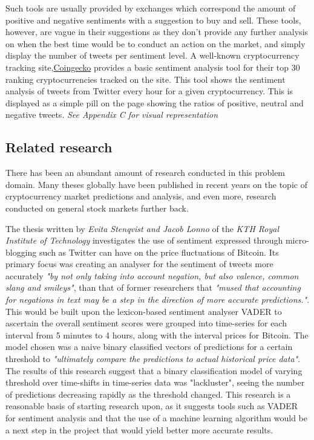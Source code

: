 \documentclass[oneside, 12pt]{article}
\begin{document}
		Such tools are usually provided by exchanges which correspond the amount of positive and negative sentiments with a suggestion to buy and sell. These tools, however, are vague in their suggestions as they don't provide any further analysis on when the best time would be to conduct an action on the market, and simply display the number of tweets per sentiment level. A well-known cryptocurrency tracking site,\href{https://www.coingecko.com}{Coingecko} provides a basic sentiment analysis tool for their top 30 ranking cryptocurrencies tracked on the site. This tool shows the sentiment analysis of tweets from Twitter every hour for a given cryptocurrency. This is displayed as a simple pill on the page showing the ratios of positive, neutral and negative tweets. \textit{See Appendix C for visual representation}
			
		\subsection{Related research}
		
		There has been an abundant amount of research conducted in this problem domain. Many theses globally have been published in recent years on the topic of cryptocurrency market predictions and analysis, and even more, research conducted on general stock markets further back. 
		
		The thesis written by \textit{Evita Stenqvist and Jacob Lonno} of the \textit{KTH Royal Institute of Technology} \cite{BTCFTsent} investigates the use of sentiment expressed through micro-blogging such as Twitter can have on the price fluctuations of Bitcoin. Its primary focus was creating an analyser for the sentiment of tweets more accurately \textit{"by not only taking into account negation, but also valence, common slang and smileys"}, than that of former researchers that \textit{"mused that accounting for negations in text may be a step in the direction of more accurate predictions."}. This would be built upon the lexicon-based sentiment analyser VADER to ascertain the overall sentiment scores were grouped into time-series for each interval from 5 minutes to 4 hours, along with the interval prices for Bitcoin. The model chosen was a naive binary classified vectors of predictions for a certain threshold to \textit{"ultimately compare the predictions to actual historical price data"}. The results of this research suggest that a binary classification model of varying threshold over time-shifts in time-series data was "lackluster", seeing the number of predictions decreasing rapidly as the threshold changed. This research is a reasonable basis of starting research upon, as it suggests tools such as VADER for sentiment analysis and that the use of a machine learning algorithm would be a next step in the project that would yield better more accurate results.
		
\end{document}
